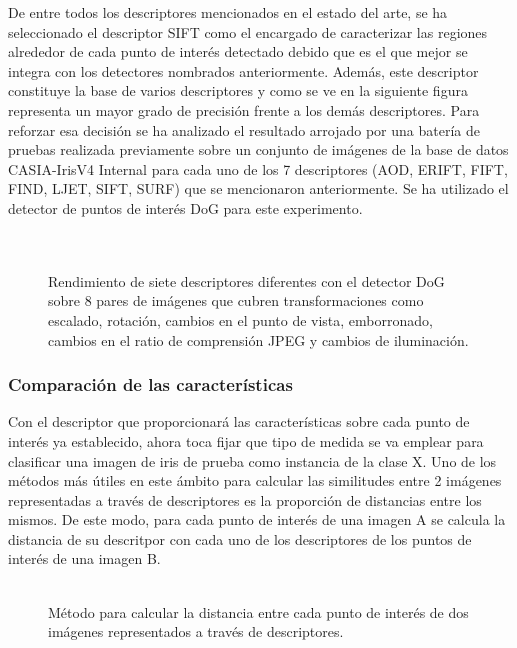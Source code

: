 De entre todos los descriptores mencionados en el estado del arte, se ha seleccionado el descriptor SIFT como el encargado de caracterizar las regiones alrededor de cada punto de interés detectado debido que es el que mejor se integra con los detectores nombrados anteriormente. Además, este descriptor constituye la base de varios descriptores y como se ve en la siguiente figura representa un mayor grado de precisión frente a los demás descriptores. Para reforzar esa decisión se ha analizado el resultado arrojado por una batería de pruebas realizada previamente sobre un conjunto de imágenes de la base de datos CASIA-IrisV4 Internal para cada uno de los 7 descriptores (AOD, ERIFT, FIFT, FIND, LJET, SIFT, SURF) que se mencionaron anteriormente. Se ha utilizado el detector de puntos de interés DoG para este experimento. \\ \\  \\


\begin{figure}[htbp]
\centering
{}
\caption{Rendimiento de siete descriptores diferentes con el detector DoG sobre 8 pares de imágenes que cubren transformaciones como escalado, rotación, cambios en el punto de vista, emborronado, cambios en el ratio de comprensión JPEG y cambios de iluminación.} \label{fig:señales}
\end{figure} 


\subsubsection{Comparación de las características}
Con el descriptor que proporcionará las características sobre cada punto de interés ya establecido, ahora toca fijar que tipo de medida se va emplear para clasificar una imagen de iris de prueba como instancia de la clase X. Uno de los métodos más útiles en este ámbito para calcular las similitudes entre 2 imágenes representadas a través de descriptores es la proporción de distancias entre los mismos. De este modo,  para cada punto de interés de una imagen A se calcula la distancia de su descritpor con cada uno de los descriptores de los puntos de interés de una imagen B. \\ \\

\begin{figure}[htbp]
\centering
{}
\caption{Método para calcular la distancia entre cada punto de interés de dos imágenes representados a través de descriptores.} \label{fig:señales}
\end{figure} 

